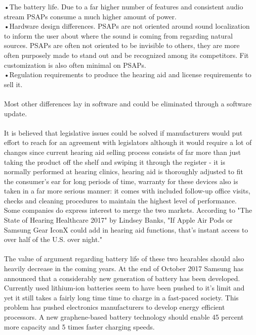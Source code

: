 •The battery life. Due to a far higher number of features and consistent audio stream PSAPs consume a much higher amount of power.\\

•Hardware design differences. PSAPs are not oriented around sound localization to inform the user about where the sound is coming from regarding natural sources. PSAPs are often not oriented to be invisible to others, they are more often purposely made to stand out and be recognized among its competitors. Fit customization is also often minimal on PSAPs.\\

•Regulation requirements to produce the hearing aid and license requirements to sell it.

\paragraph{} 
Most other differences lay in software and could be eliminated through a software update.
\paragraph{}
It is believed that legislative issues could be solved if manufacturers would put effort to reach for an agreement with legislators although it would require a lot of changes since current hearing aid selling process consists of far more than just taking the product off the shelf and swiping it through the register - it is normally performed at hearing clinics, hearing aid is thoroughly adjusted to fit the consumer's ear for long periods of time, warranty for these devices also is taken in a far more serious manner: it comes with included follow-up office visits, checks and cleaning procedures to maintain the highest level of performance. Some companies do express interest to merge the two markets. According to "The State of Hearing Healthcare 2017" by Lindsey Banks, "If Apple Air Pods or Samsung Gear IconX could add in hearing aid functions, that’s instant access to over half of the U.S. over night."  
\paragraph{}
The value of argument regarding battery life of these two hearables should also heavily decrease in the coming years. At the end of October 2017 Samsung has announced that a considerably new generation of battery has been developed. Currently used lithium-ion batteries seem to have been pushed to it's limit  and yet it still takes a fairly long time time to charge in a fast-paced society. This problem has pushed electronics manufacturers to develop energy efficient processors. A new graphene-based battery technology should enable 45 percent more capacity and 5 times faster charging speeds.
